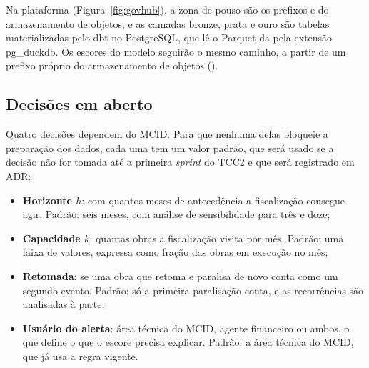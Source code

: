 Na plataforma (Figura~\ref{fig:govhub}), a zona de pouso são os prefixos  e  do armazenamento de objetos, e as camadas bronze, prata e ouro são tabelas materializadas pelo dbt no PostgreSQL, que lê o Parquet da  pela extensão pg\_duckdb. Os escores do modelo seguirão o mesmo caminho, a partir de um prefixo próprio do armazenamento de objetos ().

\subsection{Decisões em aberto}
\label{sec:decisoes-abertas}

Quatro decisões dependem do MCID. Para que nenhuma delas bloqueie a preparação dos dados, cada uma tem um valor padrão, que será usado se a decisão não for tomada até a primeira \textit{sprint} do TCC2 e que será registrado em ADR:

\begin{itemize}
	\item \textbf{Horizonte $h$}: com quantos meses de antecedência a fiscalização consegue agir. Padrão: seis meses, com análise de sensibilidade para três e doze;
	\item \textbf{Capacidade $k$}: quantas obras a fiscalização visita por mês. Padrão: uma faixa de valores, expressa como fração das obras em execução no mês;
	\item \textbf{Retomada}: se uma obra que retoma e paralisa de novo conta como um segundo evento. Padrão: só a primeira paralisação conta, e as recorrências são analisadas à parte;
	\item \textbf{Usuário do alerta}: área técnica do MCID, agente financeiro ou ambos, o que define o que o escore precisa explicar. Padrão: a área técnica do MCID, que já usa a regra vigente.
\end{itemize}
